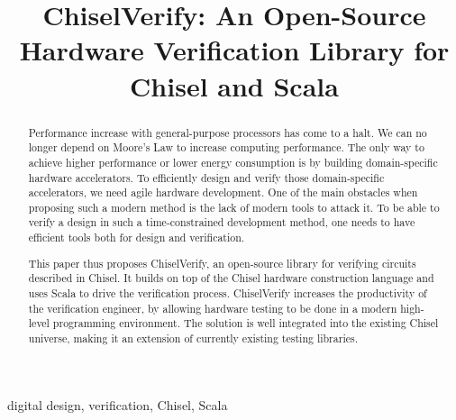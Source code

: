 \documentclass[conference]{IEEEtran}
\title{ChiselVerify: An Open-Source Hardware Verification Library for
Chisel and Scala}
\author{
\IEEEauthorblockN{No Author Given}
\IEEEauthorblockA{No Institute Given}
}
\newcommand{\hjd}[1]{{\color{pink} Hans: #1}}
\begin{document}
\maketitle
\thispagestyle{plain}
\pagestyle{plain}


\begin{abstract}
Performance increase with general-purpose processors has come to a halt.
We can no longer depend on Moore's Law to increase computing performance.
The only way to achieve higher performance or lower energy consumption
is by building domain-specific hardware accelerators.
To efficiently design and verify those domain-specific accelerators, we need
agile hardware development. One of the main obstacles when proposing such a modern method
is the lack of modern tools to attack it. To be able to verify a design in such a time-constrained development
method, one needs to have efficient tools both for design and verification.

This paper thus proposes ChiselVerify, an open-source library for verifying
circuits described in Chisel. It builds on top of the Chisel
hardware construction language and uses Scala to drive the verification process.
ChiselVerify increases the productivity of the verification engineer, by allowing hardware testing to be done in a modern high-level programming environment.
The solution is well integrated into the existing Chisel universe, making it an extension of currently existing testing libraries.


\end{abstract}

\begin{IEEEkeywords}
digital design, verification, Chisel, Scala
\end{IEEEkeywords}


\end{document}
